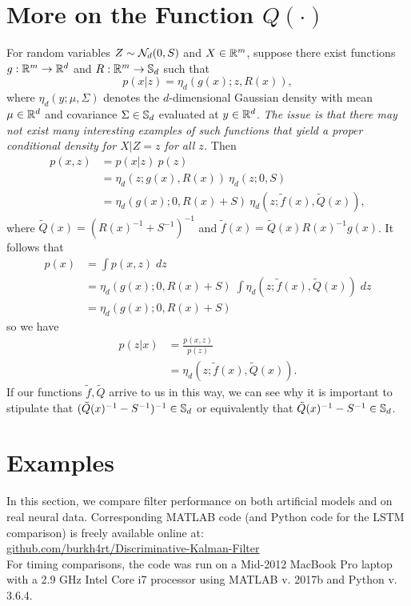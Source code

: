 \section{More on the Function $Q(\cdot)$}
For random variables $Z\sim\mathcal{N}_d(0,S)$ and $X\in\mathbb{R}^m$, suppose there exist functions ${g:\mathbb{R}^m\to\mathbb{R}^d}$ and ${R:\mathbb{R}^m\to\mathbb{S}_d}$ such that
\[
p(x|z) = \eta_d(g(x);z,R(x)),
\]
where $\eta_d(y;\mu,\Sigma)$ denotes the $d$-dimensional Gaussian density with mean $\mu\in\mathbb{R}^d$ and covariance $\Sigma\in\mathbb{S}_d$ evaluated at $y\in\mathbb{R}^d$.  \emph{The issue is that there may not exist many interesting examples of such functions that yield a proper conditional density for $X|Z=z$ for all $z$.}  Then
\begin{align*}
p(x,z) 
&= p(x|z)\:p(z) \\
&= \eta_d(z;g(x),R(x))\: \eta_d(z;0,S) \\
&= \eta_d(g(x);0,R(x)+S)\: \eta_d(z;\tilde f(x),\tilde Q(x)),
\end{align*}
where $\tilde Q(x) = (R(x)^{-1}+S^{-1})^{-1}$ and $\tilde f(x) = \tilde Q(x) R(x)^{-1}g(x)$.  It follows that
\begin{align*}
p(x)
&= \int p(x,z)\; dz \\
&= \eta_d(g(x);0,R(x)+S)\; \int \eta_d(z;\tilde f(x),\tilde Q(x))\; dz \\
&= \eta_d(g(x);0,R(x)+S)
\end{align*}
so we have
\begin{align*}
p(z|x)
&= \frac{p(x,z)}{p(z)} \\
&= \eta_d(z;\tilde f(x),\tilde Q(x)).
\end{align*}
If our functions $\tilde f, \tilde Q$ arrive to us in this way, we can see why it is important to stipulate that $(\tilde Q(x)^{-1}-S^{-1})^{-1}\in\mathbb{S}_d$ or equivalently that $\tilde Q(x)^{-1}-S^{-1}\in\mathbb{S}_d$.

\section{Examples}

In this section, we compare filter performance on both artificial models and on real neural data.  Corresponding MATLAB code (and Python code for the LSTM comparison) is freely available online at: \\
\url{github.com/burkh4rt/Discriminative-Kalman-Filter}\\
For timing comparisons, the code was run on a Mid-2012 MacBook Pro laptop with a 2.9 GHz Intel Core i7 processor using MATLAB v. 2017b and Python v. 3.6.4.

